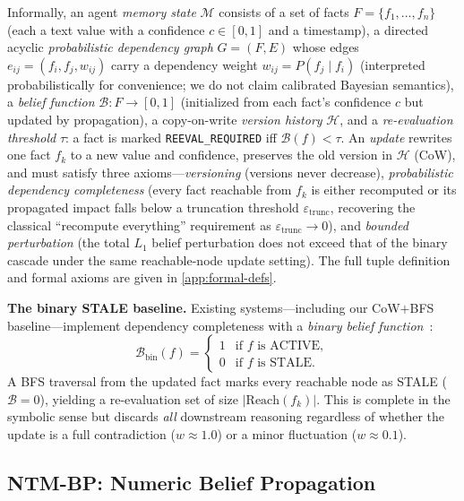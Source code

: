 \documentclass{article}
\theoremstyle{definition}
\begin{document}
Informally, an agent \emph{memory state} $\mathcal{M}$ consists of a set
of facts $F=\{f_1,\dots,f_n\}$ (each a text value with a confidence
$c\in[0,1]$ and a timestamp), a directed acyclic \emph{probabilistic
dependency graph} $G=(F,E)$ whose edges $e_{ij}=(f_i,f_j,w_{ij})$
carry a dependency weight $w_{ij}=P(f_j\mid f_i)$ (interpreted
probabilistically for convenience; we do not claim calibrated Bayesian
semantics), a
\emph{belief function} $\mathcal{B}:F\to[0,1]$ (initialized from each
fact's confidence $c$ but updated by propagation), a copy-on-write
\emph{version history} $\mathcal{H}$, and a \emph{re-evaluation
threshold} $\tau$: a fact is marked \texttt{REEVAL\_REQUIRED} iff
$\mathcal{B}(f)<\tau$.  An \emph{update} rewrites one fact $f_k$ to a new
value and confidence, preserves the old version in $\mathcal{H}$ (CoW),
and must satisfy three axioms---\emph{versioning} (versions never
decrease), \emph{probabilistic dependency completeness} (every fact
reachable from $f_k$ is either recomputed or its propagated impact falls
below a truncation threshold $\varepsilon_{\text{trunc}}$, recovering the
classical ``recompute everything'' requirement as
$\varepsilon_{\text{trunc}}\to0$), and \emph{bounded perturbation} (the
total $L_1$ belief perturbation does not exceed that of the binary
cascade under the same reachable-node update setting).  The full tuple definition
and formal axioms are given in \cref{app:formal-defs}.

\textbf{The binary STALE baseline.}  Existing systems---including our
CoW$+$BFS baseline---implement dependency completeness with a \emph{binary
belief function}~\cite{doyle1979tms,dekleer1986atms}:
\[
\mathcal{B}_{\text{bin}}(f) = \begin{cases}
1 & \text{if $f$ is ACTIVE},\\
0 & \text{if $f$ is STALE}.
\end{cases}
\]
A BFS traversal from the updated fact marks every reachable node as
STALE ($\mathcal{B}=0$), yielding a re-evaluation set of size
$|\text{Reach}(f_k)|$.  This is complete in the symbolic
sense but discards \emph{all} downstream reasoning regardless of whether
the update is a full contradiction ($w\approx1.0$) or a minor
fluctuation ($w\approx0.1$).

\subsection{NTM-BP: Numeric Belief Propagation}
\label{sec:ntm-bp}
\end{document}
